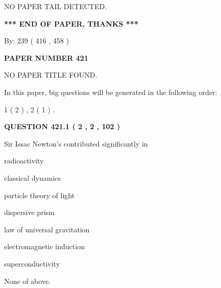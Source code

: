 \documentclass[12pt]{article}
\begin{document}
   
   
   
\vspace{2.0in} NO PAPER TAIL DETECTED.
   
   
   
   
\vspace{1.0in} 
{\textbf{\large{ *** END OF PAPER, THANKS *** }}} 
   
   
\hspace{1.0in} By: 
 239 ( 416 ,  458 )
   
   
   
   
\newpage 
\setcounter{page}{ 
   421001 } 
   
   
   
   
 {\textbf{ \Large{ PAPER NUMBER  421  }}}
   
   
\vspace{0.2in}
   
   
   
   
   
   
 NO PAPER TITLE FOUND.
   
   
   
\vspace{0.2in}
   
In this paper, big questions will be generated in the following order: 
   
   
   1 ( 2 )
 ,
   2 ( 1 )
 .
  
\vspace{0.2in}
  
{\textbf{\Large{QUESTION
421.1 
 ( 2 , 2 , 102 )
}}}
  
  
Sir Issac Newton's contributed significantly in
 
 
radioactivity
 
 
classical dynamics
 
 
particle theory of light
 
 
dispersive prism
 
 
law of universal gravitation
 
 
electromagnetic induction
 
 
superconductivity
 
 
 None of above.
 
 
\noindent{}
 
\end{document}
